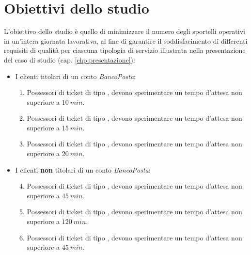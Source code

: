 \chapter{Obiettivi dello studio}\label{chp:obiettivi}
L'obiettivo dello studio è quello di minimizzare il numero degli sportelli operativi in un'intera giornata lavorativa, al fine di garantire il soddisfacimento di differenti requisiti di qualità per ciascuna tipologia di servizio illustrata nella presentazione del caso di studio (cap. \ref{chp:presentazione}):

\begin{itemize}
\item I clienti titolari di un conto \textsl{BancoPosta}:
\begin{enumerate}[label=QoS-\arabic*), align=left, leftmargin=*]
\item Possessori di ticket di tipo \uo{}, devono sperimentare un tempo d'attesa non superiore a $10\ min$.
\item Possessori di ticket di tipo \pp{}, devono sperimentare un tempo d'attesa non superiore a $15\ min$.
\item Possessori di ticket di tipo \sr{}, devono sperimentare un tempo d'attesa non superiore a $20\ min$.
\end{enumerate}
\item I clienti \textbf{non} titolari di un conto \textsl{BancoPosta}:
\begin{enumerate}[label=QoS-\arabic*), align=left, leftmargin=*]
\setcounter{enumi}{3}
\item Possessori di ticket di tipo \uo{}, devono sperimentare un tempo d'attesa non superiore a $45\ min$.
\item Possessori di ticket di tipo \pp{}, devono sperimentare un tempo d'attesa non superiore a $120\ min$.
\item Possessori di ticket di tipo \sr{}, devono sperimentare un tempo d'attesa non superiore a $45\ min$.
\end{enumerate}
\end{itemize}